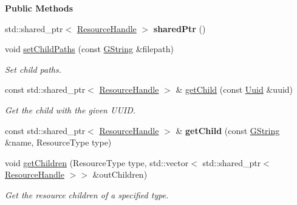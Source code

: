 \begin{Indent}\textbf{ Public Methods}\par
\begin{DoxyCompactItemize}
\item 
\mbox{\label{classrev_1_1_resource_handle_a86389d30d8b82736f8a337d010570f78}} 
std\+::shared\+\_\+ptr$<$ \mbox{\hyperlink{classrev_1_1_resource_handle}{Resource\+Handle}} $>$ {\bfseries shared\+Ptr} ()
\item 
void \mbox{\hyperlink{classrev_1_1_resource_handle_a858af28a2065a86b394e7ddc11349fac}{set\+Child\+Paths}} (const \mbox{\hyperlink{classrev_1_1_g_string}{G\+String}} \&filepath)
\begin{DoxyCompactList}\small\item\em Set child paths. \end{DoxyCompactList}\item 
\mbox{\label{classrev_1_1_resource_handle_a0e95dc55fd734cbc82fc822c161d958c}} 
const std\+::shared\+\_\+ptr$<$ \mbox{\hyperlink{classrev_1_1_resource_handle}{Resource\+Handle}} $>$ \& \mbox{\hyperlink{classrev_1_1_resource_handle_a0e95dc55fd734cbc82fc822c161d958c}{get\+Child}} (const \mbox{\hyperlink{classrev_1_1_uuid}{Uuid}} \&uuid)
\begin{DoxyCompactList}\small\item\em Get the child with the given U\+U\+ID. \end{DoxyCompactList}\item 
\mbox{\label{classrev_1_1_resource_handle_a0a6efd6f10622fd3175a20fd1fc29302}} 
const std\+::shared\+\_\+ptr$<$ \mbox{\hyperlink{classrev_1_1_resource_handle}{Resource\+Handle}} $>$ \& {\bfseries get\+Child} (const \mbox{\hyperlink{classrev_1_1_g_string}{G\+String}} \&name, Resource\+Type type)
\item 
\mbox{\label{classrev_1_1_resource_handle_ad26edc93beed1ae4e300148fc6dba403}} 
void \mbox{\hyperlink{classrev_1_1_resource_handle_ad26edc93beed1ae4e300148fc6dba403}{get\+Children}} (Resource\+Type type, std\+::vector$<$ std\+::shared\+\_\+ptr$<$ \mbox{\hyperlink{classrev_1_1_resource_handle}{Resource\+Handle}} $>$$>$ \&out\+Children)
\begin{DoxyCompactList}\small\item\em Get the resource children of a specified type. \end{DoxyCompactList}\item 
$$
\end{DoxyCompactItemize}
\end{Indent}
